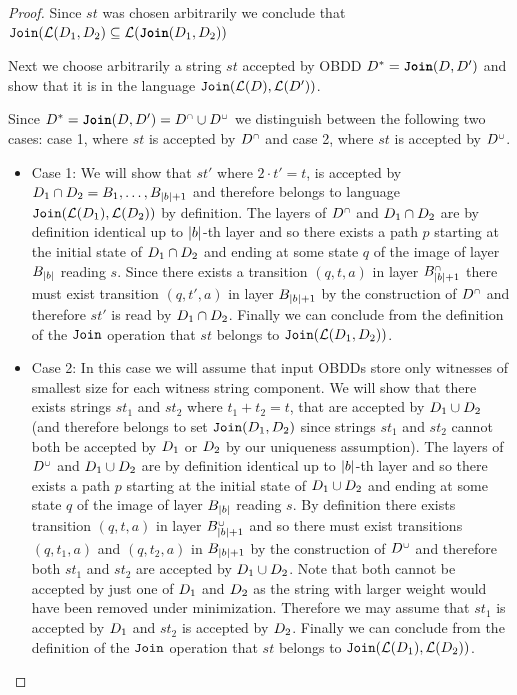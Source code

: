 \begin{proof}
    Since $st$ was chosen arbitrarily we conclude that $\texttt{Join}(\mathcal{L}(D_1,D_2)\subseteq\mathcal{L}(\texttt{\textbf{Join}}(D_1,D_2))  $

    Next we choose arbitrarily a string $st$ accepted by OBDD $D^* = \texttt{\textbf{Join}}(D,D')$ and show that it is in the language $\texttt{Join}(\mathcal{L}(D),\mathcal{L}(D'))$.

    Since $D^* = \texttt{\textbf{Join}}(D,D') = D^{{\scriptscriptstyle\cap}} \cup D^{{\scriptscriptstyle\cup}}$ we distinguish between the following two cases: case 1, where $st$ is accepted by $D^{\scriptscriptstyle\cap}$ and case 2, where $st$ is accepted by $D^{\scriptscriptstyle\cup}$.
    \begin{itemize}
        \item Case 1: We will show that $st'$ where $2 \cdot t' = t$, is accepted by $D_1 \cap D_2 = B_1,\ldots,B_{|b|+1}$ and therefore belongs to language $\texttt{Join}(\mathcal{L}(D_1),\mathcal{L}(D_2))$ by definition. The layers of $D^{\scriptscriptstyle\cap}$ and $D_1 \cap D_2$ are by definition identical up to $|b|$-th layer and so there exists a path $p$ starting at the initial state of $D_1 \cap D_2$ and ending at some state $q$ of the image of layer $B_{|b|}$ reading $s$. Since there exists a transition $(q,t,a)$ in layer $B_{|b|+1}^{\scriptscriptstyle\cap}$ there must exist transition $(q,t',a)$ in layer $B_{|b|+1}$ by the construction of $D^{\scriptscriptstyle\cap}$ and therefore $st'$ is read by $D_1 \cap D_2$. Finally we can conclude from the definition of the $\texttt{Join}$ operation that $st$ belongs to $\texttt{Join}(\mathcal{L}(D_1,D_2))$.
        
        
        \item Case 2: In this case we will assume that input OBDDs store only witnesses of smallest size for each witness string component. We will show that there exists strings $st_1$ and $st_2$ where $t_1 + t_2 = t$, that are accepted by $D_1\cup D_2$ (and therefore belongs to set $\texttt{Join}(D_1,D_2)$ since strings $st_1$ and $st_2$ cannot both be accepted by $D_1$ or $D_2$ by our uniqueness assumption). The layers of $D^{\scriptscriptstyle\cup}$ and $D_1 \cup D_2$ are by definition identical up to $|b|$-th layer and so there exists a path $p$ starting at the initial state of $D_1 \cup D_2$ and ending at some state $q$ of the image of layer $B_{|b|}$ reading $s$. By definition there exists transition $(q,t,a)$ in layer $B_{|b|+1}^{\scriptscriptstyle\cup}$ and so there must exist transitions $(q,t_1,a)$ and $(q,t_2,a)$ in $B_{|b|+1}$ by the construction of $D^{\scriptscriptstyle\cup}$ and therefore both $st_1$ and $st_2$ are accepted by $D_1 \cup D_2$. Note that both cannot be accepted by just one of $D_1$ and $D_2$ as the string with larger weight would have been removed under minimization. Therefore we may assume that $st_1$ is accepted by $D_1$ and $st_2$ is accepted by $D_2$. Finally we can conclude from the definition of the $\texttt{Join}$ operation that $st$ belongs to $\texttt{Join}(\mathcal{L}(D_1),\mathcal{L}(D_2))$. 
        

\end{itemize}
\end{proof}
